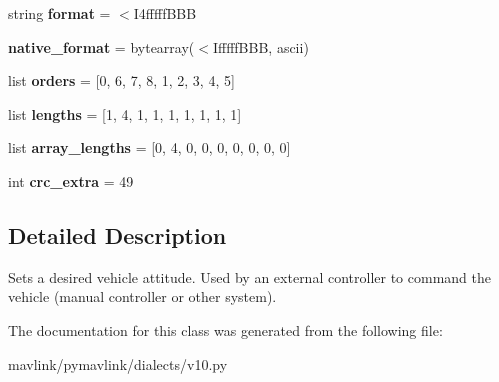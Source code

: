 \begin{DoxyCompactItemize}
\item 
\mbox{\label{classpymavlink_1_1dialects_1_1v10_1_1MAVLink__set__attitude__target__message_a1bd4d8827105421656a429bb8efb5ef4}} 
string {\bfseries format} = \textquotesingle{}$<$I4fffff\+B\+BB\textquotesingle{}
\item 
\mbox{\label{classpymavlink_1_1dialects_1_1v10_1_1MAVLink__set__attitude__target__message_a89ec8278fb3c9c75e8f2421f9d630bd5}} 
{\bfseries native\+\_\+format} = bytearray(\textquotesingle{}$<$Ifffff\+B\+BB\textquotesingle{}, \textquotesingle{}ascii\textquotesingle{})
\item 
\mbox{\label{classpymavlink_1_1dialects_1_1v10_1_1MAVLink__set__attitude__target__message_a00fce57dc0b174560e0e4964479c1bc3}} 
list {\bfseries orders} = \mbox{[}0, 6, 7, 8, 1, 2, 3, 4, 5\mbox{]}
\item 
\mbox{\label{classpymavlink_1_1dialects_1_1v10_1_1MAVLink__set__attitude__target__message_a806c7cf4074d6e403c3e7253d4d389e6}} 
list {\bfseries lengths} = \mbox{[}1, 4, 1, 1, 1, 1, 1, 1, 1\mbox{]}
\item 
\mbox{\label{classpymavlink_1_1dialects_1_1v10_1_1MAVLink__set__attitude__target__message_aa89ebec00674b7327e26f901c2a2957f}} 
list {\bfseries array\+\_\+lengths} = \mbox{[}0, 4, 0, 0, 0, 0, 0, 0, 0\mbox{]}
\item 
\mbox{\label{classpymavlink_1_1dialects_1_1v10_1_1MAVLink__set__attitude__target__message_a1d45102bcf9ea19875c72a744b8ec2e5}} 
int {\bfseries crc\+\_\+extra} = 49
\end{DoxyCompactItemize}


\subsection{Detailed Description}
\begin{DoxyVerb}Sets a desired vehicle attitude. Used by an external
controller to command the vehicle (manual controller or other
system).
\end{DoxyVerb}
 

The documentation for this class was generated from the following file\+:\begin{DoxyCompactItemize}
\item 
mavlink/pymavlink/dialects/v10.\+py\end{DoxyCompactItemize}
